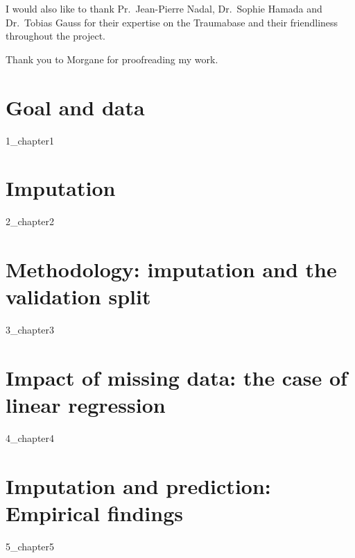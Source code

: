 \documentclass[12pt, a4paper]{memoir}
\begin{document}
I would also like to thank Pr.\ Jean-Pierre Nadal, Dr.\ Sophie Hamada and Dr.\ Tobias Gauss for their expertise on the Traumabase and their friendliness throughout the project.

Thank you to Morgane for proofreading my work.
\vspace*{\fill}
\newpage

\tableofcontents*
\vspace*{\fill}


\chapter{Goal and data}
\label{data}
 {1_chapter1}

\chapter{Imputation}
\label{imputation}
{2_chapter2}
		
\chapter{Methodology: imputation and the validation split}
\label{validation}
{3_chapter3}
		
		
\chapter{Impact of missing data: the case of linear regression}
\label{linreg}
{4_chapter4} 

\chapter{Imputation and prediction: Empirical findings}
\label{empirical}
{5_chapter5}
\end{document}
